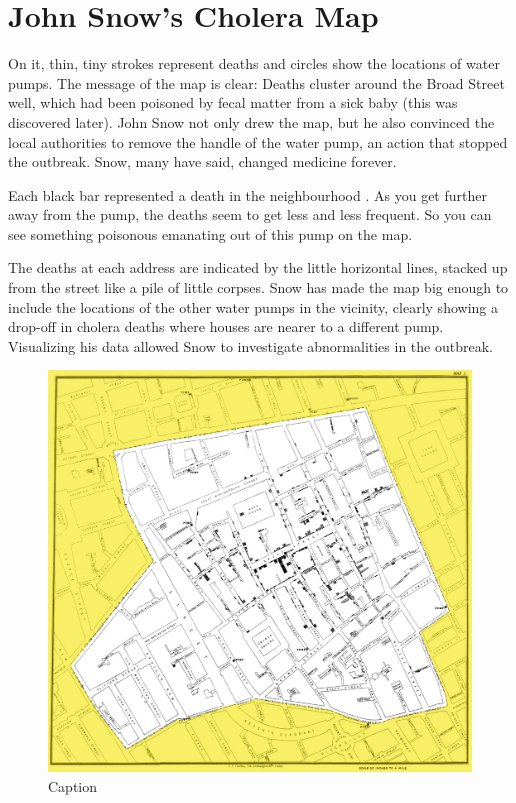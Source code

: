 \documentclass[12pt]{article}
\begin{document}
\section{John Snow's Cholera Map}


On it, thin, tiny strokes represent deaths and circles show the locations of water pumps. The message of the map is clear: Deaths cluster around the Broad Street well, which had been poisoned by fecal matter from a sick baby (this was discovered later). John Snow not only drew the map, but he also convinced the local authorities to remove the handle of the water pump, an action that stopped the outbreak. Snow, many have said, changed medicine forever. \cite{heros}

Each black bar represented a death in the neighbourhood \cite{tedtalk}. As you get further away from the pump, the deaths seem to get less and less frequent. So you can see something poisonous emanating out of this pump on the map. 

The deaths at each address are indicated by the little horizontal lines, stacked up from the street like a pile of little corpses. Snow has made the map big enough to include the locations of the other water pumps in the vicinity, clearly showing a drop-off in cholera deaths where houses are nearer to a different pump. Visualizing his data allowed Snow to investigate abnormalities in the outbreak. \cite{blog}

    \begin{figure}
    \centering
    \includegraphics{snowmap_1854}
    \caption{Caption}
    \label{fig:snow}
    \end{figure}
    
\end{document}

